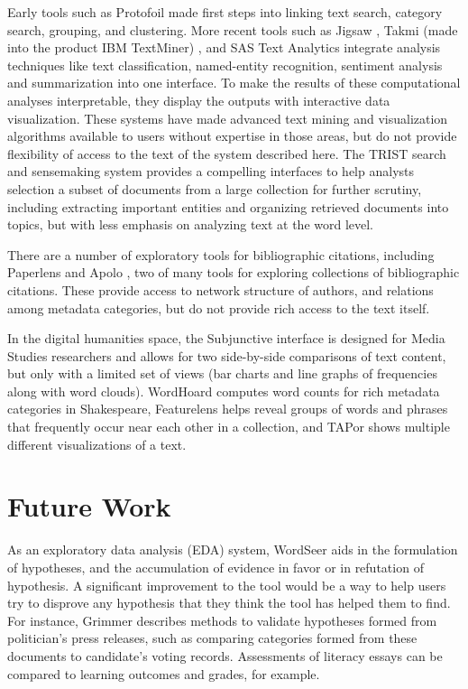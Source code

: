 \documentclass{sig-alternate}
\begin{document}
 Early tools such as Protofoil \cite{rao1994protofoil} made first steps into linking text search, category search, grouping, and clustering.  More recent tools such as Jigsaw \cite{gorg_combining_2012},  Takmi (made into the product IBM TextMiner) \cite{uramoto2004text}, and SAS Text Analytics integrate analysis techniques like text classification, named-entity recognition, sentiment analysis and summarization into one interface. 
 To make the results of these computational analyses interpretable, they display the outputs with interactive data visualization. These systems have made advanced text mining and visualization algorithms available to users without expertise in those areas, but do not provide flexibility of  access to the text of the system described here.   The TRIST search and sensemaking system \cite{jonker2005information} provides a compelling interfaces to help analysts selection a subset of documents from a large collection for further scrutiny, including extracting important entities and organizing retrieved documents into topics, but with less emphasis on analyzing text at the word level.

There are a number of exploratory tools for bibliographic citations, including Paperlens \cite{lee2005understanding} and Apolo \cite{chau2011apolo}, two  of many tools for exploring collections of bibliographic citations.  These provide access to network structure of authors, and relations among metadata categories, but do not provide rich access to the text itself.

In the digital humanities space, the Subjunctive interface \cite{bron2012subjunctive} is designed for Media Studies researchers and allows for two side-by-side comparisons of text content, but only with a limited set of views (bar charts and line graphs of frequencies along with word clouds).  WordHoard \cite{mueller_digital_2008} computes word counts for rich metadata categories in Shakespeare, Featurelens \cite{don2007discovering} helps  reveal groups of words and phrases that frequently occur near each other in a collection, and
TAPor \cite{rockwell2003text} shows multiple different visualizations of a text.

\section{Future Work}
As an exploratory data analysis (EDA) system, WordSeer aids in the formulation of hypotheses, and the accumulation of evidence in favor or in refutation of hypothesis. A significant improvement to the tool would be a way to help users try to disprove any hypothesis that they think the tool has helped them to find. For instance, Grimmer \cite{grimmer} describes methods to validate hypotheses formed from politician's press releases, such as comparing categories formed from these documents to candidate's voting records.  Assessments of literacy essays can be compared to learning outcomes and grades, for example.  
\end{document}
